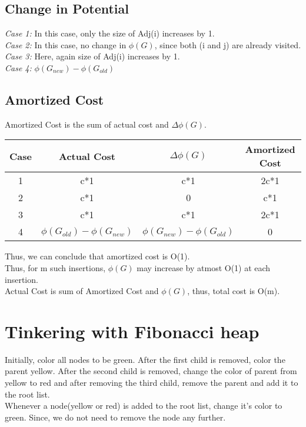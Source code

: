 \documentclass{article}
\begin{document}
\subsection{ Change in Potential}


\emph{Case 1: } In this case, only the size of Adj(i) increases by 1.\\
\emph{Case 2: } In this case, no change in $\phi(G)$, since both (i and j) are already visited.\\
\emph{Case 3: } Here, again size of Adj(i) increases by 1.\\
\emph{Case 4: } $\phi(G_{new}) - \phi(G_{old})$


\subsection{Amortized Cost}

Amortized Cost is the sum of actual cost and $\Delta \phi(G)$. \\


\begin{center}
\begin{tabular}{|c|c|c|c|}
\hline
Case & Actual Cost & $\Delta \phi(G) $ & Amortized Cost \\
\hline
1 & c*1 & c*1 &  2c*1 \\
\hline
2 & c*1 & 0 & c*1 \\
\hline
3 & c*1 & c*1 & 2c*1 \\
\hline
4 & $\phi(G_{old}) - \phi(G_{new})$ & $\phi(G_{new}) - \phi(G_{old})$ & 0 \\
\hline
\end{tabular}
\end{center}
Thus, we can conclude that amortized cost is O(1).\\
Thus, for m such insertions, $\phi(G)$ may increase by atmost O(1) at each insertion.\\
Actual Cost is sum of Amortized Cost and $\phi(G)$, thus, total cost is O(m).

\section{Tinkering with Fibonacci heap}

Initially, color all nodes to be green. After the first child is removed, color the parent yellow. After the second child is removed, change the color of parent from yellow to red and after removing the third child, remove the parent and add it to the root list. \\
Whenever a node(yellow or red) is added to the root list, change it's color to green. Since, we do not need to remove the node any further. 
\end{document}
